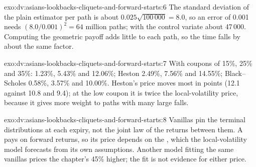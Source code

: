\begin{solution}{exo:dv:asians-lookbacks-cliquets-and-forward-starts:6}
The standard deviation of the plain estimator per path is about $0.025\sqrt{100\,000}=8.0$, so an error of 0.001 needs
$(8.0/0.001)^2=64$ million paths; with the control variate about 47\,000. Computing the geometric payoff adds little to each path,
so the time falls by about the same factor.
\end{solution}

\begin{solution}{exo:dv:asians-lookbacks-cliquets-and-forward-starts:7}
With coupons of 15\%, 25\% and 35\%:  1.23\%, 5.43\% and 12.06\%; Heston 2.49\%, 7.56\% and 14.55\%; Black--Scholes
0.58\%, 3.57\% and 10.00\%. Heston's price moves most in points (12.1 against 10.8 and 9.4); at the low coupon it is twice the
local-volatility price, because it gives more weight to paths with many large falls.
\end{solution}

\begin{solution}{exo:dv:asians-lookbacks-cliquets-and-forward-starts:8}
Vanillas pin the terminal distributions at each expiry, not the joint law of the returns between them. A  pays on
forward returns, so its price depends on the , which the local-volatility model forecasts from its own
assumptions. Another model fitting the same vanillas prices the chapter's  45\% higher; the fit is not evidence for
either price.
\end{solution}

